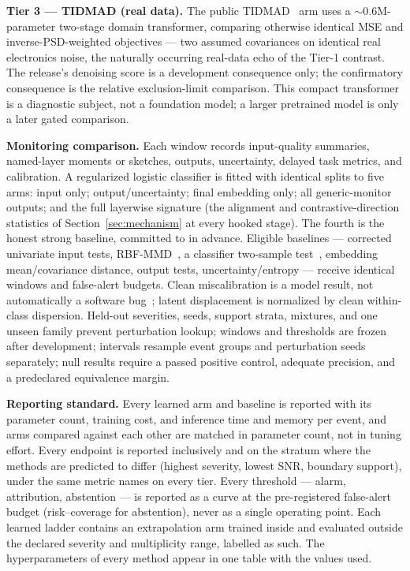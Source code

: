 \documentclass[10pt,twocolumn]{extarticle}
\begin{document}
\textbf{Tier 3 --- TIDMAD (real data).} The public TIDMAD~\cite{tidmad} arm
uses a $\sim0.6$M-parameter two-stage domain transformer, comparing otherwise
identical MSE and inverse-PSD-weighted objectives --- two assumed covariances
on identical real electronics noise, the naturally occurring real-data echo of
the Tier-1 contrast. The release's denoising score is a development
consequence only; the confirmatory consequence is the relative
exclusion-limit comparison. This compact transformer is a diagnostic subject,
not a foundation model; a larger pretrained model is only a later gated
comparison.

\textbf{Monitoring comparison.} Each window records input-quality summaries,
named-layer moments or sketches, outputs, uncertainty, delayed task metrics,
and calibration. A regularized logistic classifier is fitted with identical
splits to five arms: input only; output/uncertainty; final embedding only; all
generic-monitor outputs; and the full layerwise signature (the alignment and contrastive-direction
statistics of Section~\ref{sec:mechanism} at every hooked stage). The fourth
is the honest strong baseline, committed to in advance. Eligible baselines ---
corrected univariate input tests, RBF-MMD~\cite{gretton2012}, a classifier
two-sample test~\cite{lopezpaz2017}, embedding mean/covariance distance, output
tests, uncertainty/entropy --- receive identical windows and false-alert
budgets. Clean miscalibration is a model result, not automatically a software
bug~\cite{guo2017}; latent displacement is normalized by clean within-class
dispersion. Held-out severities, seeds, support strata, mixtures, and one
unseen family prevent perturbation lookup; windows and thresholds are frozen
after development; intervals resample event groups and perturbation seeds
separately; null results require a passed positive control, adequate precision,
and a predeclared equivalence margin.

\textbf{Reporting standard.} Every learned arm and baseline is reported with
its parameter count, training cost, and inference time and memory per event,
and arms compared against each other are matched in parameter count, not in
tuning effort. Every endpoint is reported inclusively and on the stratum where
the methods are predicted to differ (highest severity, lowest SNR, boundary
support), under the same metric names on every tier. Every threshold ---
alarm, attribution, abstention --- is reported as a curve at the
pre-registered false-alert budget (risk--coverage for abstention), never as a
single operating point. Each learned ladder contains an extrapolation arm
trained inside and evaluated outside the declared severity and multiplicity
range, labelled as such. The hyperparameters of every method appear in one
table with the values used.
\end{document}
